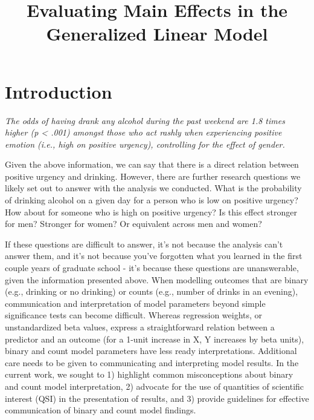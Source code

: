 \documentclass[jou, apacite]{apa6}
\begin{document}
\title{Evaluating Main Effects in the Generalized Linear Model}


\abstract{}



\maketitle

\section{Introduction}
\textit{The odds of having drank any alcohol during the past weekend are 1.8 times higher (p < .001) amongst those who act rashly when experiencing positive emotion (i.e., high on positive urgency), controlling for the effect of gender.}

Given the above information, we can say that there is a direct relation between positive urgency and drinking. However, there are further research questions we likely set out to answer with the analysis we conducted. What is the probability of drinking alcohol on a given day for a person who is low on positive urgency? How about for someone who is high on positive urgency? Is this effect stronger for men? Stronger for women? Or equivalent across men and women?

If these questions are difficult to answer, it's not because the analysis can't answer them, and it's not because you've forgotten what you learned in the first couple years of graduate school - it's because these questions are unanswerable, given the information presented above. 
When modelling outcomes that are binary (e.g., drinking or no drinking) or counts (e.g., number of drinks in an evening), communication and interpretation of model parameters beyond simple significance tests can become difficult. 
Whereas regression weights, or unstandardized beta values, express a straightforward relation between a predictor and an outcome (for a 1-unit increase in X, Y increases by beta units), binary and count model parameters have less ready interpretations. 
Additional care needs to be given to communicating and interpreting model results.
In the current work, we sought to 1) highlight common misconceptions about binary and count model interpretation, 2) advocate for the use of quantities of scientific interest (QSI) in the presentation of results, and 3) provide guidelines for effective communication of binary and count model findings.
\end{document}
